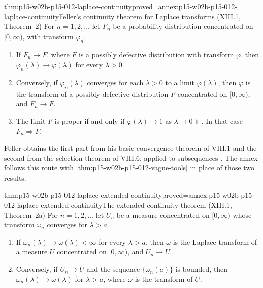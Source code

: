 \begin{hbtheorem}{thm:p15-w02b-p15-012-laplace-continuity}{proved=annex:p15-w02b-p15-012-laplace-continuity}{Feller's continuity theorem for Laplace transforms (XIII.1, Theorem~2)}
For \(n=1,2,\ldots\) let \(F_n\) be a probability distribution concentrated on
\([0,\infty)\), with transform \(\varphi_n\).
\begin{enumerate}
\item If \(F_n\to F\), where \(F\) is a possibly defective distribution with
      transform \(\varphi\), then \(\varphi_n(\lambda)\to\varphi(\lambda)\) for
      every \(\lambda>0\).
\item Conversely, if \(\varphi_n(\lambda)\) converges for each \(\lambda>0\) to
      a limit \(\varphi(\lambda)\), then \(\varphi\) is the transform of a
      possibly defective distribution \(F\) concentrated on \([0,\infty)\),
      and \(F_n\to F\).
\item The limit \(F\) is proper if and only if \(\varphi(\lambda)\to1\) as
      \(\lambda\to0+\). In that case \(F_n\Rightarrow F\).
\end{enumerate}
\end{hbtheorem}

Feller obtains the first part from his basic convergence theorem of VIII.1
and the second from the selection theorem of VIII.6, applied to subsequences
\cite[vol.~II, XIII.1, p.~431]{Feller1971ProbabilityII}. The annex follows
this route with \cref{thm:p15-w02b-p15-012-vague-tools} in place of those two
results.

\begin{hbtheorem}{thm:p15-w02b-p15-012-laplace-extended-continuity}{proved=annex:p15-w02b-p15-012-laplace-extended-continuity}{The extended continuity theorem (XIII.1, Theorem~2a)}
For \(n=1,2,\ldots\) let \(U_n\) be a measure concentrated on \([0,\infty)\)
whose transform \(\omega_n\) converges for \(\lambda>a\).
\begin{enumerate}
\item If \(\omega_n(\lambda)\to\omega(\lambda)<\infty\) for every
      \(\lambda>a\), then \(\omega\) is the Laplace transform of a measure
      \(U\) concentrated on \([0,\infty)\), and \(U_n\to U\).
\item Conversely, if \(U_n\to U\) and the sequence \(\{\omega_n(a)\}\) is
      bounded, then \(\omega_n(\lambda)\to\omega(\lambda)\) for
      \(\lambda>a\), where \(\omega\) is the transform of \(U\).
\end{enumerate}
\end{hbtheorem}

